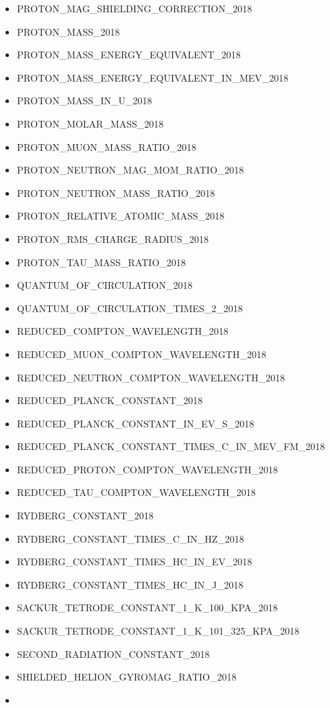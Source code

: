 \begin{itemize}
\item
  PROTON\_MAG\_SHIELDING\_CORRECTION\_2018
\item
  PROTON\_MASS\_2018
\item
  PROTON\_MASS\_ENERGY\_EQUIVALENT\_2018
\item
  PROTON\_MASS\_ENERGY\_EQUIVALENT\_IN\_MEV\_2018
\item
  PROTON\_MASS\_IN\_U\_2018
\item
  PROTON\_MOLAR\_MASS\_2018
\item
  PROTON\_MUON\_MASS\_RATIO\_2018
\item
  PROTON\_NEUTRON\_MAG\_MOM\_RATIO\_2018
\item
  PROTON\_NEUTRON\_MASS\_RATIO\_2018
\item
  PROTON\_RELATIVE\_ATOMIC\_MASS\_2018
\item
  PROTON\_RMS\_CHARGE\_RADIUS\_2018
\item
  PROTON\_TAU\_MASS\_RATIO\_2018
\item
  QUANTUM\_OF\_CIRCULATION\_2018
\item
  QUANTUM\_OF\_CIRCULATION\_TIMES\_2\_2018
\item
  REDUCED\_COMPTON\_WAVELENGTH\_2018
\item
  REDUCED\_MUON\_COMPTON\_WAVELENGTH\_2018
\item
  REDUCED\_NEUTRON\_COMPTON\_WAVELENGTH\_2018
\item
  REDUCED\_PLANCK\_CONSTANT\_2018
\item
  REDUCED\_PLANCK\_CONSTANT\_IN\_EV\_S\_2018
\item
  REDUCED\_PLANCK\_CONSTANT\_TIMES\_C\_IN\_MEV\_FM\_2018
\item
  REDUCED\_PROTON\_COMPTON\_WAVELENGTH\_2018
\item
  REDUCED\_TAU\_COMPTON\_WAVELENGTH\_2018
\item
  RYDBERG\_CONSTANT\_2018
\item
  RYDBERG\_CONSTANT\_TIMES\_C\_IN\_HZ\_2018
\item
  RYDBERG\_CONSTANT\_TIMES\_HC\_IN\_EV\_2018
\item
  RYDBERG\_CONSTANT\_TIMES\_HC\_IN\_J\_2018
\item
  SACKUR\_TETRODE\_CONSTANT\_1\_K\_100\_KPA\_2018
\item
  SACKUR\_TETRODE\_CONSTANT\_1\_K\_101\_325\_KPA\_2018
\item
  SECOND\_RADIATION\_CONSTANT\_2018
\item
  SHIELDED\_HELION\_GYROMAG\_RATIO\_2018
\item

\end{itemize}
